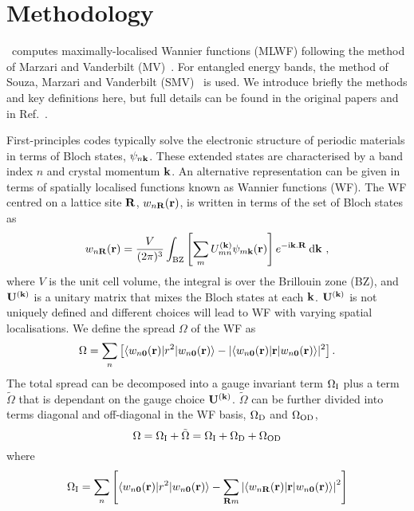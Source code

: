 \chapter{Methodology}\label{sec:method}
\wannier\ computes maximally-localised Wannier functions (MLWF)
following the method of Marzari and Vanderbilt
(MV)~\cite{marzari-prb97}.  For entangled energy bands, the method of
Souza, Marzari and Vanderbilt (SMV)~\cite{souza-prb01} is used. We
introduce briefly the methods and key definitions here, but full
details can be found in the original papers and in
Ref.~\cite{mostofi-cpc08}.

First-principles codes typically solve the electronic structure of
periodic materials in terms of Bloch states, $\psi_{n{\bf k}}$. 
These extended states are characterised by a band index $n$ and crystal
momentum ${\bf k}$. An alternative representation can be given in terms
of spatially localised functions known as Wannier functions (WF). The WF 
centred on a lattice site ${\bf R}$, $w_{n{\bf R}}({\bf r})$, 
is written in terms of the set of Bloch states as
\begin{equation}
w_{n{\bf R}}({\bf r})=\frac{V}{(2\pi)^3}\int_{\mathrm{BZ}}
\left[\sum_{m} U^{({\bf k})}_{mn} \psi_{m{\bf k}}({\bf
    r})\right]e^{-\mathrm{i}{\bf k}.{\bf R}} \:\mathrm{d}{\bf k} \ , 
\end{equation}
where $V$ is the unit cell volume, the integral is over the Brillouin
zone (BZ), and $\mathbf{U}^{(\mathbf{k})}$ is a unitary matrix that mixes the Bloch 
states at each ${\bf k}$. $\mathbf{U}^{(\mathbf{k})}$ is not uniquely defined and different
choices will lead to WF with varying spatial localisations. We define
the spread $\Omega$ of the WF as 
\begin{equation}
\Omega=\sum_n \left[\langle w_{n{\bf 0}}({\bf r})| r^2 | w_{n{\bf
      0}}({\bf r}) \rangle - | \langle w_{n{\bf 0}}({\bf r})| {\bf r}
      | w_{n{\bf 0}}({\bf r}) \rangle |^2 \right].
\end{equation}
The total spread can be decomposed into a gauge invariant term
$\Omega_{\rm I}$ plus a term ${\tilde \Omega}$ that is dependant on the gauge
choice $\mathbf{U}^{(\mathbf{k})}$. ${\tilde \Omega}$ can
be further divided into terms diagonal and off-diagonal in the WF basis,
$\Omega_{\rm D}$ and $\Omega_{\rm OD}$,
\begin{equation}
\Omega=\Omega_{\rm I}+{\tilde \Omega}=\Omega_{\rm I}+\Omega_{\rm
  D}+\Omega_{\rm OD} 
\end{equation}
where
\begin{equation}
\Omega_{{\rm I}}=\sum_n \left[\langle w_{n{\bf 0}}({\bf r})| r^2 | w_{n{\bf
      0}}({\bf r}) \rangle - \sum_{{\bf R}m} \left| \langle w_{n{\bf
      R}}({\bf r})| {\bf r} | w_{n{\bf 0}}({\bf r}) \rangle \right| ^2
      \right] 
\end{equation}
